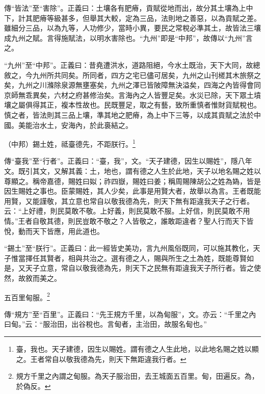 {\noindent\zhuan{}\fzbyks 傳“皆法”至“害除”。正義曰：土壤各有肥瘠，貢賦從地而出，故分其土壤為上中下，計其肥瘠等級甚多，但舉其大較，定為三品，法則地之善惡，以為貢賦之差。雖細分三品，以為九等，人功修少，當時小異，要民之常稅必準其土，故皆法三壤成九州之賦。言得施賦法，以明水害除也。“九州”即是“中邦”，故傳以“九州”言之。 \par}

{\noindent\shu{}\fzkt “九州”至“中邦”。正義曰：昔堯遭洪水，道路阻絕，今水土既治，天下大同，故總敘之，今九州所共同矣。所同者，四方之宅已儘可居矣，九州之山刊槎其木旅祭之矣，九州之川滌除泉源無壅塞矣，九州之澤已皆陂障無決溢矣，四海之內皆得會同京師無乖異矣，六材之府甚修治矣。言海內之人皆豐足矣。水災已除，天下眾土墳壤之屬俱得其正，複本性故也。民既豐足，取之有藝，致所重慎者惟財貨賦稅也。慎之者，皆法則其三品上壤，準其地之肥瘠，為上中下三等，以成其貢賦之法於中國。美能治水土，安海內，於此裛結之。 \par}

（中邦）錫土姓，祗臺德先，不距朕行。\footnote{臺，我也。天子建德，因生以賜姓。謂有德之人生此地，以此地名賜之姓以顯之。王者常自以敬我德為先，則天下無距違我行者。}

{\noindent\zhuan{}\fzbyks 傳“臺我”至“行者”。正義曰：“臺，我”，文。“天子建德，因生以賜姓”，隱八年文。既引其文，又解其義：土，地也，謂有德之人生於此地，天子以地名賜之姓以尊顯之。稱帝嘉德，賜姓曰姒；祚四嶽，賜姓曰姜；稱周賜陳胡公之姓為媯，皆是因生賜姓之事也。臣蒙賜姓，其人少矣，此事是用賢大者，故舉以為言。王者既能用賢，又能謹敬，其立意也常自以敬我德為先，則天下無有距違我天子之行者。云：“上好禮，則民莫敢不敬。上好義，則民莫敢不服。上好信，則民莫敢不用情。”王者自敬其德，則民豈敢不敬之？人皆敬之，誰敢距違者？聖人行而天下皆悅，動而天下皆應，用此道也。 \par}

{\noindent\shu{}\fzkt “錫土”至“朕行”。正義曰：此一經皆史美功，言九州風俗既同，可以施其教化，天子惟當擇任其賢者，相與共治之。選有德之人，賜與所生之土為姓，既能尊賢如是，又天子立意，常自以敬我德為先，則天下之民無有距違我天子所行者。皆之使然，故敘而美之。 \par}

五百里甸服。\footnote{規方千里之內謂之甸服。為天子服治田，去王城面五百里。甸，田遍反。為，於偽反。}

{\noindent\zhuan{}\fzbyks 傳“規方”至“百里”。正義曰：“先王規方千里，以為甸服”，文。亦云：“千里之內曰甸。”云：“服治田，出谷稅也。言甸者，主治田，故服名甸也。” \par}

